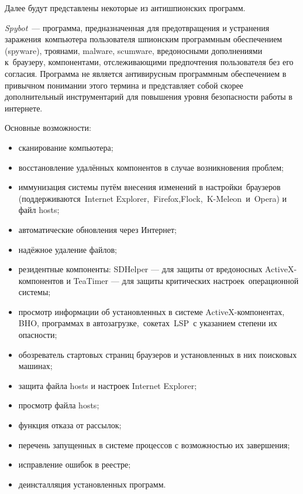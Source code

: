 Далее будут представлены некоторые из антишпионских программ.

\textit{Spybot} --- программа, предназначенная для предотвращения и устранения
заражения компьютера пользователя шпионским программным обеспечением (spyware),
троянами, malware, scumware, вредоносными дополнениями к браузеру,
компонентами, отслеживающими предпочтения пользователя без его согласия.
Программа не является антивирусным программным обеспечением в привычном
понимании этого термина и представляет собой скорее дополнительный инструментарий
для повышения уровня безопасности работы в интернете.

Основные возможности:
\begin{itemize}
\item сканирование компьютера;
\item восстановление удалённых компонентов в случае возникновения проблем;
\item иммунизация системы путём внесения изменений в настройки браузеров
(поддерживаются Internet Explorer, Firefox,Flock, K-Meleon и Opera) и файл hosts;
\item автоматические обновления через Интернет;
\item надёжное удаление файлов;
\item резидентные компоненты: SDHelper --- для защиты от вредоносных
ActiveX-компонентов и TeaTimer --- для защиты критических настроек операционной системы;
\item просмотр информации об установленных в системе ActiveX-компонентах,
BHO, программах в автозагрузке, сокетах LSP с указанием степени их опасности;
\item обозреватель стартовых страниц браузеров и установленных в них поисковых машинах;
\item защита файла hosts и настроек Internet Explorer;
\item просмотр файла hosts;
\item функция отказа от рассылок;
\item перечень запущенных в системе процессов с возможностью их завершения;
\item исправление ошибок в реестре;
\item деинсталляция установленных программ.
\end{itemize}

